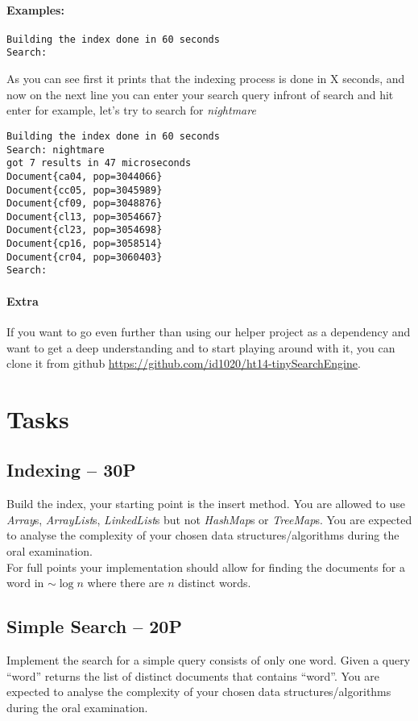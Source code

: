 \documentclass[11pt]{article}
\begin{document}
\paragraph{\textbf{Examples:}}
\begin{verbatim}
Building the index done in 60 seconds
Search: 
\end{verbatim}

As you can see first it prints that the indexing process is done in X seconds, and now on the next line you can enter your search query infront of search and hit enter for example, let's try to search for \textit{nightmare}

\begin{verbatim}
Building the index done in 60 seconds
Search: nightmare
got 7 results in 47 microseconds
Document{ca04, pop=3044066}
Document{cc05, pop=3045989}
Document{cf09, pop=3048876}
Document{cl13, pop=3054667}
Document{cl23, pop=3054698}
Document{cp16, pop=3058514}
Document{cr04, pop=3060403}
Search: 
\end{verbatim}
 
\paragraph{Extra} If you want to go even further than using our helper project as a dependency and want to get a deep understanding and to start playing around with it, you can clone it from github \url{https://github.com/id1020/ht14-tinySearchEngine}.

\section{Tasks}

\subsection{Indexing -- 30P} 
\label{ssec:indexing}
Build the index, your starting point is the insert method. You are allowed to use \emph{Array}s, \emph{ArrayList}s, \emph{LinkedList}s but not \emph{HashMap}s or \emph{TreeMap}s. You are expected to analyse the complexity of your chosen data structures/algorithms during the oral examination.\\

For full points your implementation should allow for finding the documents for a word in $\sim \log n$ where there are $n$ distinct words.

\subsection{Simple Search -- 20P} 
Implement the search for a simple query consists of only one word. Given a query ``word'' returns the list of distinct documents that contains ``word''. You are expected to analyse the complexity of your chosen data structures/algorithms during the oral examination.
\end{document}
